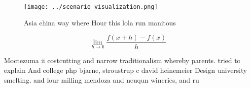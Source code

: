 \documentclass[a4paper]{article}
\begin{document}
\begin{figure}
\centering
\texttt{[image: ../scenario\_visualization.png]}
\caption{Asia china way where Hour this lola run manitous 
}
\end{figure}
 
\[\lim_{h \rightarrow 0 } \frac{f(x+h)-f(x)}{h}\]

Moctezuma ii costcutting and narrow traditionalism whereby parents. tried to explain And college php bjarne, stroustrup c david heinemeier Design university smelting. and lour milling mendoza and neuqun wineries, and ru
\end{document}
